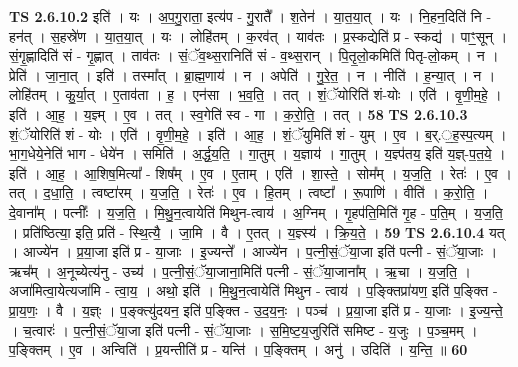 \documentclass[17pt]{extarticle}
\begin{document}
                  \newline
                                \textbf{ TS 2.6.10.2} \newline
                  इति॑ । यः । अ॒प॒गु॒राता॒ इत्य॑प - गु॒रातै᳚ । श॒तेन॑ । या॒त॒या॒त् । यः । नि॒हन॒दिति॑ नि - हन॑त् । स॒हस्रे॑ण । या॒त॒या॒त् । यः । लोहि॑तम् । क॒रव॑त् । याव॑तः । प्र॒स्कद्येति॑ प्र - स्कद्य॑ । पाꣳ॒॒सून् । सं॒गृ॒ह्णादिति॑ सं - गृ॒ह्णात् । ताव॑तः । सं॒ॅव॒थ्स॒रानिति॑ सं - व॒थ्स॒रान् । पि॒तृ॒लो॒कमिति॑ पितृ-लो॒कम् । न । प्रेति॑ । जा॒ना॒त् । इति॑ । तस्मा᳚त् । ब्रा॒ह्म॒णाय॑ । न । अपेति॑ । गु॒रे॒त॒ । न । नीति॑ । ह॒न्या॒त् । न । लोहि॑तम् । कु॒र्या॒त् । ए॒ताव॑ता । ह॒ । एन॑सा । भ॒व॒ति॒ । तत् । शं॒ॅयोरिति॑ शं-योः । एति॑ । वृ॒णी॒म॒हे॒ । इति॑ । आ॒ह॒ । य॒ज्ञ्म् । ए॒व । तत् । स्व॒गेति॑ स्व - गा । क॒रो॒ति॒ । तत् । \textbf{  58} \newline
                  \newline
                                \textbf{ TS 2.6.10.3} \newline
                  शं॒ॅयोरिति॑ शं - योः । एति॑ । वृ॒णी॒म॒हे॒ । इति॑ । आ॒ह॒ । शं॒ॅयुमिति॑ शं - युम् । ए॒व । ब॒र्.॒ह॒स्प॒त्यम् । भा॒ग॒धेये॒नेति॑ भाग - धेये॑न । समिति॑ । अ॒र्द्ध॒य॒ति॒ । गा॒तुम् । य॒ज्ञाय॑ । गा॒तुम् । य॒ज्ञ्प॑तय॒ इति॑ य॒ज्ञ्-प॒त॒ये॒ । इति॑ । आ॒ह॒ । आ॒शिष॒मित्या᳚ - शिष᳚म् । ए॒व । ए॒ताम् । एति॑ । शा॒स्ते॒ । सोम᳚म् । य॒ज॒ति॒ । रेतः॑ । ए॒व । तत् । द॒धा॒ति॒ । त्वष्टा॑रम् । य॒ज॒ति॒ । रेतः॑ । ए॒व । हि॒तम् । त्वष्टा᳚ । रू॒पाणि॑ । वीति॑ । क॒रो॒ति॒ । दे॒वाना᳚म् । पत्नीः᳚ । य॒ज॒ति॒ । मि॒थु॒न॒त्वायेति॑ मिथुन-त्वाय॑ । अ॒ग्निम् । गृ॒हप॑ति॒मिति॑ गृ॒ह - प॒ति॒म् । य॒ज॒ति॒ । प्रति॑ष्ठित्या॒ इति॒ प्रति॑ - स्थि॒त्यै॒ । जा॒मि । वै । ए॒तत् । य॒ज्ञ्स्य॑ । क्रि॒य॒ते॒ । \textbf{  59} \newline
                  \newline
                                \textbf{ TS 2.6.10.4} \newline
                  यत् । आज्ये॑न । प्र॒या॒जा इति॑ प्र - या॒जाः । इ॒ज्यन्ते᳚ । आज्ये॑न । प॒त्नी॒सं॒ॅया॒जा इति॑ पत्नी - सं॒ॅया॒जाः । ऋच᳚म् । अ॒नूच्येत्य॑नु - उच्य॑ । प॒त्नी॒सं॒ॅया॒जाना॒मिति॑ पत्नी - सं॒ॅया॒जाना᳚म् । ऋ॒चा । य॒ज॒ति॒ । अजा॑मित्वा॒येत्यजा॑मि - त्वा॒य॒ । अथो॒ इति॑ । मि॒थु॒न॒त्वायेति॑ मिथुन - त्वाय॑ । प॒ङ्क्तिप्रा॑यण॒ इति॑ प॒ङ्क्ति - प्रा॒य॒णः॒ । वै । य॒ज्ञ्ः । प॒ङ्क्त्यु॑दयन॒ इति॑ प॒ङ्क्ति - उ॒द॒य॒नः॒ । पञ्च॑ । प्र॒या॒जा इति॑ प्र - या॒जाः । इ॒ज्य॒न्ते॒ । च॒त्वारः॑ । प॒त्नी॒सं॒ॅया॒जा इति॑ पत्नी - सं॒ॅया॒जाः । स॒मि॒ष्ट॒य॒जुरिति॑ समिष्ट - य॒जुः । प॒ञ्च॒मम् । प॒ङ्क्तिम् । ए॒व । अन्विति॑ । प्र॒यन्तीति॑ प्र - यन्ति॑ । प॒ङ्क्तिम् । अनु॑ । उदिति॑ । य॒न्ति॒ ॥ \textbf{  60} \newline
\end{document}
